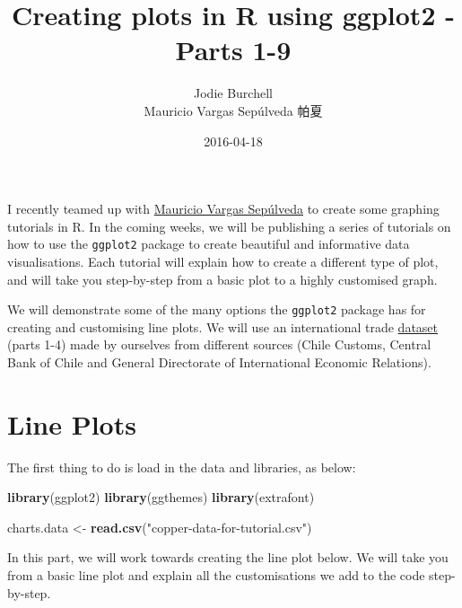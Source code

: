 \documentclass[]{article}
\title{Creating plots in R using ggplot2 - Parts 1-9}
\author{Jodie Burchell \\ Mauricio Vargas Sepúlveda 帕夏}
\date{2016-04-18}
\newenvironment{Shaded}{\begin{snugshade}}{\end{snugshade}}
\newcommand{\KeywordTok}[1]{\textcolor[rgb]{0.13,0.29,0.53}{\textbf{{#1}}}}
\newcommand{\StringTok}[1]{\textcolor[rgb]{0.31,0.60,0.02}{{#1}}}
\newcommand{\NormalTok}[1]{{#1}}
\begin{document}
\maketitle

{
\setcounter{tocdepth}{2}
\tableofcontents
}
I recently teamed up with \href{http://pachamaltese.github.io/}{Mauricio
Vargas Sepúlveda} to create some graphing tutorials in R. In the coming
weeks, we will be publishing a series of tutorials on how to use the
\texttt{ggplot2} package to create beautiful and informative data
visualisations. Each tutorial will explain how to create a different
type of plot, and will take you step-by-step from a basic plot to a
highly customised graph.

We will demonstrate some of the many options the \texttt{ggplot2}
package has for creating and customising line plots. We will use an
international trade
\href{http://pachamaltese.github.io/stats/trade-chile-china/copper-data-for-tutorial.csv}{dataset}
(parts 1-4) made by ourselves from different sources (Chile Customs,
Central Bank of Chile and General Directorate of International Economic
Relations).

\section{Line Plots}\label{line-plots}

The first thing to do is load in the data and libraries, as below:

\begin{Shaded}
\begin{Highlighting}[]
\KeywordTok{library}\NormalTok{(ggplot2)}
\KeywordTok{library}\NormalTok{(ggthemes)}
\KeywordTok{library}\NormalTok{(extrafont)}

\NormalTok{charts.data <-}\StringTok{ }\KeywordTok{read.csv}\NormalTok{(}\StringTok{"copper-data-for-tutorial.csv"}\NormalTok{)}
\end{Highlighting}
\end{Shaded}

In this part, we will work towards creating the line plot below. We will
take you from a basic line plot and explain all the customisations we
add to the code step-by-step.
\end{document}
